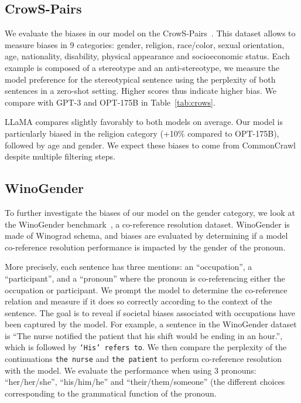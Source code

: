 \subsection{CrowS-Pairs}

We evaluate the biases in our model on the CrowS-Pairs~\cite{nangia2020crows}. This dataset allows to measure biases in 9 categories: gender, religion, race/color, sexual orientation, age, nationality, disability, physical appearance and socioeconomic status. Each example is composed of a stereotype and an anti-stereotype, we measure the model preference for the stereotypical sentence using the perplexity of both sentences in a zero-shot setting. Higher scores thus indicate higher bias. We compare with GPT-3 and OPT-175B in Table~\ref{tab:crows}.

LLaMA compares slightly favorably to both models on average. Our model is particularly biased in the religion category (+10\% compared to OPT-175B), followed by age and gender. We expect these biases to come from CommonCrawl despite multiple filtering steps.

\subsection{WinoGender}

To further investigate the biases of our model on the gender category, we look at the WinoGender benchmark~\citep{rudinger2018gender}, a co-reference resolution dataset. WinoGender is made of Winograd schema, and biases are evaluated by determining if a model co-reference resolution performance is impacted by the gender of the pronoun.

 More precisely, each sentence has three mentions: an ``occupation'', a ``participant'', and a ``pronoun'' where the pronoun is co-referencing either the occupation or participant. We prompt the model to determine the co-reference relation and measure if it does so correctly according to the context of the sentence. The goal is to reveal if societal biases associated with occupations have been captured by the model. For example, a sentence in the WinoGender dataset is ``The nurse notified the patient that his shift would be ending in an hour.'', which is followed by \texttt{`His' refers to}. We then compare the perplexity of the continuations \texttt{the nurse} and \texttt{the patient} to perform co-reference resolution with the model. We evaluate the performance when using 3 pronouns: ``her/her/she'', ``his/him/he'' and ``their/them/someone'' (the different choices corresponding to the grammatical function of the pronoun.

